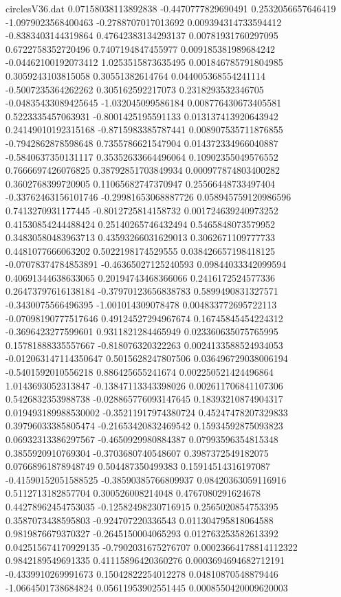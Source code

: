 \begin{filecontents}{circlesV36.dat}
0.07158038113892838	-0.4470777829690491	0.2532056657646419
-1.0979023568400463	-0.2788707017013692	0.009394314733594412
-0.8383403144319864	0.47642383134293137	0.00781931760297095
0.6722758352720496	0.7407194847455977	0.009185381989684242
-0.04462100192073412	1.0253515873635495	0.001846785791804985
0.3059243103815058	0.30551382614764	0.044005368554241114
-0.5007235364262262	0.305162592217073	0.2318293532346705
-0.04835433089425645	-1.032045099586184	0.008776430673405581
0.5223335457063931	-0.8001425195591133	0.013137413920643942
0.24149010192315168	-0.8715983385787441	0.008907535711876855
-0.7942862878598648	0.7355786621547904	0.014372334966040887
-0.5840637350131117	0.35352633664496064	0.10902355049576552
0.7666697426076825	0.38792851703849934	0.000977874803400282
0.3602768399720905	0.11065682747370947	0.25566448733497404
-0.33762463156101746	-0.29981653068887726	0.058945759120986596
0.7413270931177445	-0.8012725814158732	0.001724639240973252
0.41530854244488424	0.25140265746432494	0.5465848073579952
0.34830580483963713	0.43593266031629013	0.3062671109777733
0.4481077666063202	0.5022198174529555	0.038426657198418125
-0.07078374784853891	-0.46365027125240593	0.09844033342099594
0.40691344638633065	0.20194743468366066	0.2416172524577336
0.26473797616138184	-0.37970123656838783	0.5899490831327571
-0.3430075566496395	-1.001014309078478	0.004833772695722113
-0.07098190777517646	0.49124527294967674	0.16745845454224312
-0.3696423277599601	0.9311821284465949	0.023360635075765995
0.15781888335557667	-0.818076320322263	0.0024133588524934053
-0.012063147114350647	0.5015628247807506	0.036496729038006194
-0.5401592010556218	0.886425655241674	0.002250521424496864
1.0143693052313847	-0.13847113343398026	0.002611706841107306
0.5426832353988738	-0.028865776093147645	0.18393210874904317
0.019493189988530002	-0.35211917974380724	0.45247478207329833
0.39796033385805474	-0.21653420832469542	0.15934592875093823
0.06932313386297567	-0.4650929980884387	0.07993596354815348
0.3855920910769304	-0.3703680740548607	0.3987372549182075
0.07668961878948749	0.504487350499383	0.15914514316197087
-0.41590152051588525	-0.38590385766809937	0.08420363059116916
0.5112713182857704	0.300526008214048	0.4767080291624678
0.44278962454753035	-0.12582498230716915	0.2565020854753395
0.3587073438595803	-0.924707220336543	0.011304795818064588
0.9819876679370327	-0.2645150004065293	0.012763253582613392
0.042515674170929135	-0.7902031675276707	0.00023664178814112322
0.9842189549691335	0.41115896420360276	0.0003694694682712191
-0.4339910269991673	0.15042822254012278	0.04810870548879446
-1.0664501738684824	0.05611953902551445	0.0008550420009620003

\end{filecontents}
